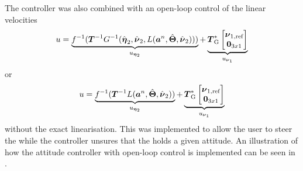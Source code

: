 The controller was also combined with an open-loop control of the linear velocities
\begin{equation}
	u = \underbrace{f^{-1}(\boldsymbol{T}^{-1} G^{-1}(\hat{\etaVector}_2,\hat{\nuVector}_2,L(\accVector^n,\hat{\eulerAngles},\hat{\nuVector}_2)))}_{u_{\etaVectorAng}} + \underbrace{\thrusterGeometryOnes[*] \begin{bmatrix} \nuVector_{1,\text{ref}} \\ \zeroCol{3} \end{bmatrix}}_{u_{\nuVectorLin}}
\end{equation}
or
\begin{equation}
	u = \underbrace{f^{-1}(\boldsymbol{T}^{-1} L(\accVector^n,\hat{\eulerAngles},\hat{\nuVector}_2))}_{u_{\etaVectorAng}} + \underbrace{\thrusterGeometryOnes[*] \begin{bmatrix} \nuVector_{1,\text{ref}} \\ \zeroCol{3} \end{bmatrix}}_{u_{\nuVectorLin}}
\end{equation}
without the exact linearisation. This was implemented to allow the user to steer the \abbrROV while the controller unsures that the \abbrROV holds a given attitude. An illustration of how the attitude controller with open-loop control is implemented can be seen in .

